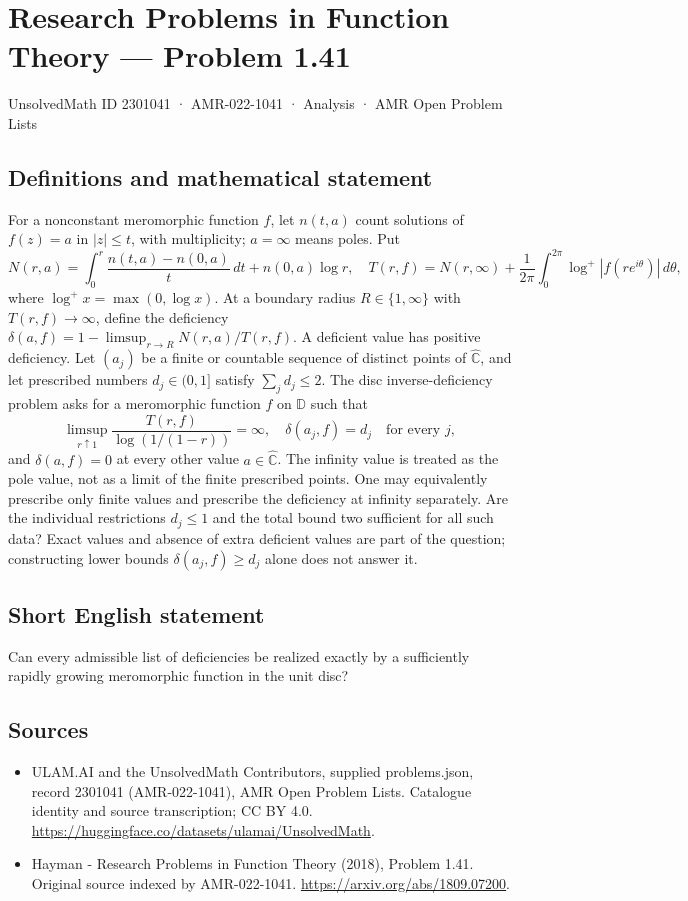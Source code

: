 \documentclass[11pt,a4paper]{article}
\begin{document}
\section*{Research Problems in Function Theory — Problem 1.41}\label{2301041}
{\small UnsolvedMath ID 2301041 · AMR-022-1041 · Analysis · AMR Open Problem Lists}
\subsection{Definitions and mathematical statement}
For a nonconstant meromorphic function $f$, let $n(t,a)$ count solutions of $f(z)=a$ in $|z|\le t$, with multiplicity; $a=\infty$ means poles. Put
\[
N(r,a)=\int_0^r\frac{n(t,a)-n(0,a)}t\,dt+n(0,a)\log r,
\quad T(r,f)=N(r,\infty)+\frac1{2\pi}\int_0^{2\pi}\log^+|f(re^{i\theta})|\,d\theta,
\]
where $\log^+x=\max(0,\log x)$. At a boundary radius $R\in\{1,\infty\}$ with $T(r,f)\to\infty$, define the deficiency
$\delta(a,f)=1-\limsup_{r\to R}N(r,a)/T(r,f)$. A deficient value has positive deficiency.
Let $(a_j)$ be a finite or countable sequence of distinct points of $\widehat{\mathbb C}$, and let prescribed numbers $d_j\in(0,1]$ satisfy
$\sum_jd_j\le2$. The disc inverse-deficiency problem asks for a meromorphic function $f$ on $\mathbb D$ such that
\[
\limsup_{r\uparrow1}\frac{T(r,f)}{\log(1/(1-r))}=\infty,
\quad \delta(a_j,f)=d_j\quad\text{for every }j,
\]
and $\delta(a,f)=0$ at every other value $a\in\widehat{\mathbb C}$. The infinity value is treated as the pole value, not as a limit of the finite prescribed points. One may equivalently prescribe only finite values and prescribe the deficiency at infinity separately.
Are the individual restrictions $d_j\le1$ and the total bound two sufficient for all such data? Exact values and absence of extra deficient values are part of the question; constructing lower bounds $\delta(a_j,f)\ge d_j$ alone does not answer it.
\subsection{Short English statement}
Can every admissible list of deficiencies be realized exactly by a sufficiently rapidly growing meromorphic function in the unit disc?
\subsection{Sources}
\begin{itemize}
\item[S1] ULAM.AI and the UnsolvedMath Contributors, supplied problems.json, record 2301041 (AMR-022-1041), AMR Open Problem Lists. Catalogue identity and source transcription; CC BY 4.0.
\url{https://huggingface.co/datasets/ulamai/UnsolvedMath}.
\item[S2] Hayman - Research Problems in Function Theory (2018), Problem 1.41. Original source indexed by AMR-022-1041.
\url{https://arxiv.org/abs/1809.07200}.
\end{itemize}
\end{document}
